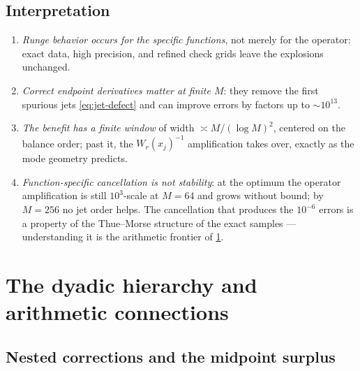\documentclass[11pt,oneside]{article}
\numberwithin{equation}{section}
\theoremstyle{definition}
\theoremstyle{remark}
\begin{document}
\subsection{Interpretation}

\begin{enumerate}
\item\emph{Runge behavior occurs for the specific functions}, not
merely for the operator: exact data, high precision, and refined
check grids leave the explosions unchanged.
\item\emph{Correct endpoint derivatives matter at finite $M$}: they
remove the first spurious jets \eqref{eq:jet-defect} and can improve
errors by factors up to $\sim10^{13}$.
\item\emph{The benefit has a finite window} of width
$\asymp M/(\log M)^{2}$, centered on the balance order; past it, the
$W_r(x_j)^{-1}$ amplification takes over, exactly as the mode
geometry predicts.
\item\emph{Function-specific cancellation is not stability}: at the
optimum the operator amplification is still $10^{3}$-scale at
$M=64$ and grows without bound; by $M=256$ no jet order helps.  The
cancellation that produces the $10^{-6}$ errors is a property of the
Thue--Morse structure of the exact samples --- understanding it is
the arithmetic frontier of \cref{sec:connections}.
\end{enumerate}

\section{The dyadic hierarchy and arithmetic connections}
\label{sec:connections}

\subsection{Nested corrections and the midpoint surplus}
\end{document}
